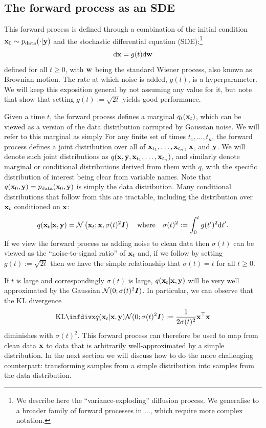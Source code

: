 \subsection{The forward process as an SDE} \label{sec:diffusion-forward-sde}
This forward process is defined through a combination of the initial condition ${\mathbf{x}}_0 \sim p_{\rm{data}}(\cdot|{\mathbf{y}})$ and the stochastic differential equation (SDE):\footnote{We describe here the ``variance-exploding'' diffusion process. We generalise to a broader family of forward processes in ..., which require more complex notation.}
\begin{equation} \label{eq:forward-diffusion}
    \mathrm{d}{\mathbf{x}} = g(t) \mathrm{d}{\mathbf{w}}
\end{equation}
defined for all $t \geq 0$, with ${\mathbf{w}}$ being the standard Wiener process, also known as Brownian motion. The rate at which noise is added, $g(t)$, is a hyperparameter. We will keep this exposition general by not assuming any value for it, but note that \citet{karras2022elucidating} show that setting $g(t) := \sqrt{2t}$ yields good performance.

Given a time $t$, the forward process defines a marginal $q_t({\mathbf{x}}_t)$, which can be viewed as a version of the data distribution corrupted by Gaussian noise. We will refer to this marginal as simply
For any finite set of times $t_1,\ldots,t_n$, the forward process defines a joint distribution over all of ${\mathbf{x}}_{t_1},\ldots,{\mathbf{x}}_{t_n}$, ${\mathbf{x}}$, and ${\mathbf{y}}$. We will denote such joint distributions as $q({\mathbf{x}},{\mathbf{y}},{\mathbf{x}}_{t_1},\ldots,{\mathbf{x}}_{t_n})$, and similarly denote marginal or conditional distributions derived from them with $q$, with the specific distribution of interest being clear from variable names. Note that $q({\mathbf{x}}_0,{\mathbf{y}}) = p_{\rm{data}}({\mathbf{x}}_0,{\mathbf{y}})$ is simply the data distribution. Many conditional distributions that follow from this are tractable, including the distribution over ${\mathbf{x}}_t$ conditioned on ${\mathbf{x}}$:
\begin{equation}
    q({\mathbf{x}}_t|{\mathbf{x}},{\mathbf{y}}) = {\mathcal{N}} \left( {\mathbf{x}}_t; {\mathbf{x}}, \sigma(t)^2 {\bm{I}} \right) \quad \text{where} \quad \sigma(t)^2 := \int_0^t g(t')^2 \mathrm{d}t'.
\end{equation}
If we view the forward process as adding noise to clean data then $\sigma(t)$ can be viewed as the ``noise-to-signal ratio'' of ${\mathbf{x}}_t$ and, if we follow \citet{karras2022elucidating} by setting $g(t) := \sqrt{2t}$ then we have the simple relationship that $\sigma(t) = t$ for all $t\geq0$.

If $t$ is large and correspondingly $\sigma(t)$ is large, $q({\mathbf{x}}_t|{\mathbf{x}},{\mathbf{y}})$ will be very well approximated by the Gaussian ${\mathcal{N}}(0; \sigma(t)^2{\bm{I}})$. In particular, we can observe that the KL divergence
\begin{equation}
    \kl{q(\rvx_t|\rvx,\rvy)}{\gN(0; \sigma(t)^2\mI)} :=\frac{1}{2\sigma(t)^2} \rvx^\top \rvx
\end{equation}
diminishes with $\sigma(t)^2$. This forward process can therefore be used to map from clean data ${\mathbf{x}}$ to data that is arbitrarily well-approximated by a simple distribution. In the next section we will discuss how to do the more challenging counterpart: transforming samples from a simple distribution into samples from the data distribution.

